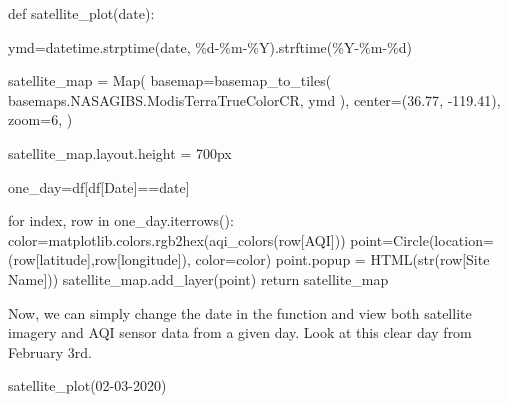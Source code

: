 \documentclass[
  letterpaper,
  DIV=11,
  numbers=noendperiod]{scrreprt}
\newenvironment{Shaded}{\begin{snugshade}}{\end{snugshade}}
\newcommand{\BuiltInTok}[1]{\textcolor[rgb]{0.00,0.23,0.31}{#1}}
\newcommand{\ControlFlowTok}[1]{\textcolor[rgb]{0.00,0.23,0.31}{#1}}
\newcommand{\DecValTok}[1]{\textcolor[rgb]{0.68,0.00,0.00}{#1}}
\newcommand{\FloatTok}[1]{\textcolor[rgb]{0.68,0.00,0.00}{#1}}
\newcommand{\KeywordTok}[1]{\textcolor[rgb]{0.00,0.23,0.31}{#1}}
\newcommand{\NormalTok}[1]{\textcolor[rgb]{0.00,0.23,0.31}{#1}}
\newcommand{\OperatorTok}[1]{\textcolor[rgb]{0.37,0.37,0.37}{#1}}
\newcommand{\SpecialCharTok}[1]{\textcolor[rgb]{0.37,0.37,0.37}{#1}}
\newcommand{\StringTok}[1]{\textcolor[rgb]{0.13,0.47,0.30}{#1}}
\begin{document}
\begin{Shaded}
\begin{Highlighting}[]
\KeywordTok{def}\NormalTok{ satellite\_plot(date):}
  
\NormalTok{  ymd}\OperatorTok{=}\NormalTok{datetime.strptime(date, }\StringTok{\textquotesingle{}}\SpecialCharTok{\%d}\StringTok{{-}\%m{-}\%Y\textquotesingle{}}\NormalTok{).strftime(}\StringTok{\textquotesingle{}\%Y{-}\%m{-}}\SpecialCharTok{\%d}\StringTok{\textquotesingle{}}\NormalTok{)}

\NormalTok{  satellite\_map }\OperatorTok{=}\NormalTok{ Map(}
\NormalTok{    basemap}\OperatorTok{=}\NormalTok{basemap\_to\_tiles(}
\NormalTok{      basemaps.NASAGIBS.ModisTerraTrueColorCR, ymd}
\NormalTok{    ),}
\NormalTok{    center}\OperatorTok{=}\NormalTok{(}\FloatTok{36.77}\NormalTok{, }\OperatorTok{{-}}\FloatTok{119.41}\NormalTok{),}
\NormalTok{    zoom}\OperatorTok{=}\DecValTok{6}\NormalTok{,}
\NormalTok{  )}

\NormalTok{  satellite\_map.layout.height }\OperatorTok{=} \StringTok{\textquotesingle{}700px\textquotesingle{}}

\NormalTok{  one\_day}\OperatorTok{=}\NormalTok{df[df[}\StringTok{\textquotesingle{}Date\textquotesingle{}}\NormalTok{]}\OperatorTok{==}\NormalTok{date]}

  \ControlFlowTok{for}\NormalTok{ index, row }\KeywordTok{in}\NormalTok{ one\_day.iterrows():}
\NormalTok{    color}\OperatorTok{=}\NormalTok{matplotlib.colors.rgb2hex(aqi\_colors(row[}\StringTok{\textquotesingle{}AQI\textquotesingle{}}\NormalTok{]))}
\NormalTok{    point}\OperatorTok{=}\NormalTok{Circle(location}\OperatorTok{=}\NormalTok{(row[}\StringTok{\textquotesingle{}latitude\textquotesingle{}}\NormalTok{],row[}\StringTok{\textquotesingle{}longitude\textquotesingle{}}\NormalTok{]), color}\OperatorTok{=}\NormalTok{color)}
\NormalTok{    point.popup }\OperatorTok{=}\NormalTok{ HTML(}\BuiltInTok{str}\NormalTok{(row[}\StringTok{\textquotesingle{}Site Name\textquotesingle{}}\NormalTok{]))    }
\NormalTok{    satellite\_map.add\_layer(point)}
  \ControlFlowTok{return}\NormalTok{ satellite\_map}
\end{Highlighting}
\end{Shaded}

Now, we can simply change the date in the function and view both
satellite imagery and AQI sensor data from a given day. Look at this
clear day from February 3rd.

\begin{Shaded}
\begin{Highlighting}[]
\NormalTok{satellite\_plot(}\StringTok{\textquotesingle{}02{-}03{-}2020\textquotesingle{}}\NormalTok{)}
\end{Highlighting}
\end{Shaded}
\end{document}
